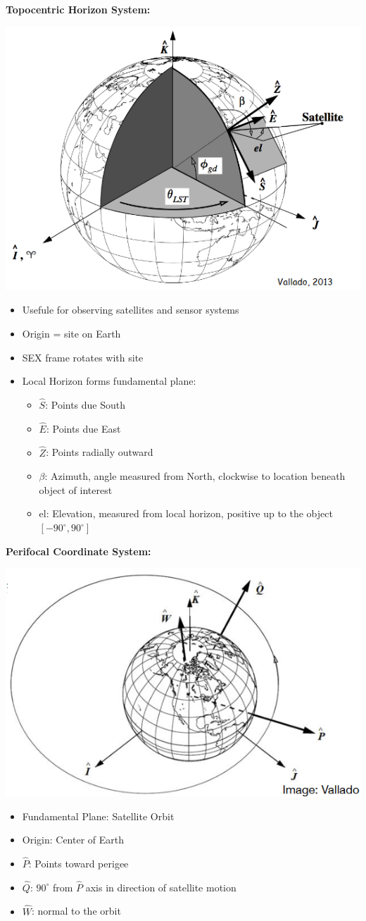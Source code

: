 \documentclass{article}
\begin{document}
\begin{multicols*}{3}
    \textbf{Topocentric Horizon System:}\par 
    \includegraphics[width=0.5\linewidth]{Figures/SEZ.png}
    \begin{itemize}
        \item Usefule for observing satellites and sensor systems
        \item Origin = site on Earth
        \item SEX frame rotates with site
        \item Local Horizon forms fundamental plane:
            \begin{itemize}
                \item $\hat{S}$: Points due South
                \item $\hat{E}$: Points due East
                \item $\hat{Z}$: Points radially outward
                \item $\beta$: Azimuth, angle measured from North, clockwise to location beneath object of interest
                \item el: Elevation, measured from local horizon, positive up to the object $[-90^\circ,90^\circ]$
            \end{itemize}
    \end{itemize}

    \textbf{Perifocal Coordinate System:}\par 
    \includegraphics[width=0.5\linewidth]{Figures/perifocal_orbit.png}
    \begin{itemize}
        \item Fundamental Plane: Satellite Orbit
        \item Origin: Center of Earth
        \item $\hat{P}$: Points toward perigee
        \item $\hat{Q}$: $90^\circ$ from $\hat{P}$ axis in direction of satellite motion
        \item $\hat{W}$: normal to the orbit 
    \end{itemize}


\end{multicols*}
\end{document}
